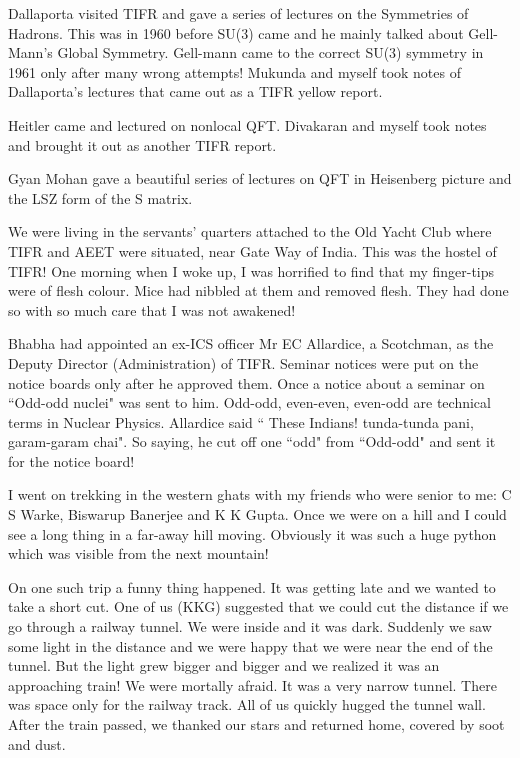 Dallaporta visited TIFR and gave a series of lectures on the Symmetries 
of Hadrons. This was in 1960 before SU(3) came and he mainly talked 
about Gell-Mann's Global Symmetry. Gell-mann came to the correct SU(3) 
symmetry in 1961 only after many wrong attempts! Mukunda and myself took 
notes of Dallaporta's lectures that came out as a TIFR yellow report.

Heitler came and lectured on nonlocal QFT. Divakaran and myself took 
notes and brought it out as another TIFR report.

Gyan Mohan gave a beautiful series of lectures on QFT in Heisenberg 
picture and the LSZ form of the S matrix.

We were living in the servants' quarters attached to the Old Yacht Club 
where TIFR and AEET were situated, near Gate Way of India. This was the 
hostel of TIFR! One morning when I woke up, I was horrified to find that 
my finger-tips were of flesh colour. Mice had nibbled at them and 
removed flesh. They had done so with so much care that I was not 
awakened!

Bhabha had appointed an ex-ICS officer Mr EC Allardice, a Scotchman, 
as the Deputy Director (Administration) of TIFR. Seminar notices were 
put on the notice boards only after he approved them. Once a notice 
about a seminar on ``Odd-odd nuclei" was sent to him. Odd-odd, even-even, 
even-odd are technical terms in Nuclear Physics. Allardice said `` These 
Indians! tunda-tunda pani, garam-garam chai". So saying, he cut off one 
``odd" from ``Odd-odd" and sent it for the notice board!

I went on trekking in the western ghats with my friends who were senior 
to me: C S Warke, Biswarup Banerjee and K K Gupta. Once we were on a 
hill and I could see a long thing in a far-away hill moving. Obviously 
it was such a huge python which was visible from the next mountain!
 
On one such trip a funny thing happened. It was getting late and we 
wanted to take a short cut. One of us (KKG) suggested that we could cut 
the distance if we go through a railway tunnel. We were inside and it 
was dark. Suddenly we saw some light in the distance and we were happy 
that we were near the end of the tunnel. But the light grew bigger and 
bigger and we realized it was an approaching train! We were mortally 
afraid. It was a very narrow tunnel. There was space only for the 
railway track. All of us quickly hugged the tunnel wall. After the train 
passed, we thanked our stars and returned home, covered by soot and 
dust.

